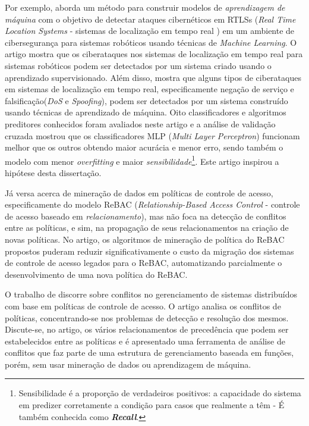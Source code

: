 Por exemplo, \cite{guerrero-higueras_detection_2018} aborda um método para construir modelos de \textit{aprendizagem de máquina} com o objetivo de detectar ataques cibernéticos em RTLSs (\textit{Real Time Location Systems} - sistemas de localização em tempo real ) em um ambiente de cibersegurança para sistemas robóticos usando técnicas de \textit{Machine Learning}.  O artigo mostra que os ciberataques nos sistemas de localização em tempo real para sistemas robóticos podem ser detectados por um sistema criado usando o aprendizado supervisionado. Além disso, mostra que alguns tipos de ciberataques em sistemas de localização em tempo real, especificamente negação de serviço e falsificação(\textit{DoS} e \textit{Spoofing}), podem ser detectados por um sistema construído usando técnicas de aprendizado de máquina. Oito classificadores e algoritmos preditores conhecidos foram avaliados neste artigo e a análise de validação cruzada mostrou que os classificadores MLP (\textit{Multi Layer Perceptron}) funcionam melhor que os outros obtendo maior acurácia e menor erro, sendo também o modelo com menor \textit{overfitting} e maior \textit{sensibilidade}\footnote{Sensibilidade é a proporção de verdadeiros positivos: a capacidade do sistema em predizer corretamente a condição para casos que realmente a têm - É também conhecida como \textit{\textbf{Recall}}.}. Este artigo inspirou a hipótese desta dissertação.

Já \cite{bui_efficient_2019} versa acerca de mineração de dados em políticas de controle de acesso, especificamente do modelo ReBAC (\textit{Relationship-Based Access Control} - controle de acesso baseado em \textit{relacionamento}), mas não foca na detecção de conflitos entre as políticas, e sim, na propagação de seus relacionamentos na criação de novas políticas. No artigo, os algoritmos de mineração de política do ReBAC propostos puderam reduzir significativamente o custo da migração dos sistemas de controle de acesso legados para o ReBAC, automatizando parcialmente o desenvolvimento de uma nova política do ReBAC.

O trabalho de \cite{lupu_conflicts_1999} discorre sobre conflitos no gerenciamento de sistemas distribuídos com base em políticas de controle de acesso. O artigo analisa os conflitos de políticas, concentrando-se nos problemas de detecção e resolução dos mesmos. Discute-se, no artigo, os vários relacionamentos de precedência que podem ser estabelecidos entre as políticas e é apresentado uma ferramenta de análise de conflitos que faz parte de uma estrutura de gerenciamento baseada em funções, porém, sem usar mineração de dados ou aprendizagem de máquina.

